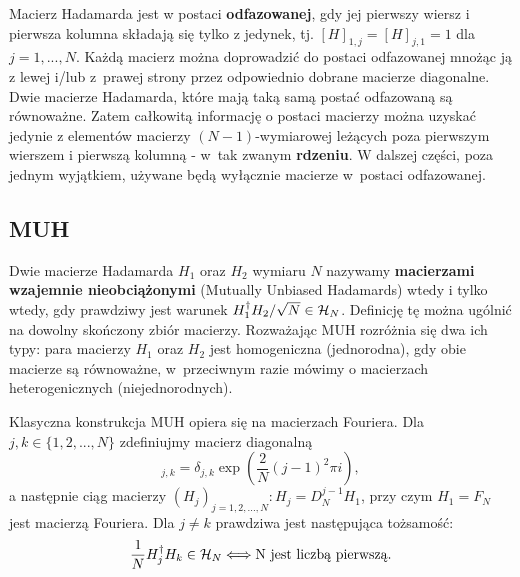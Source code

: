 \documentclass[a4paper,12pt,twoside]{article}
\newcommand{\HADAMARDS}[1]{{\cal H}_{#1}}
\begin{document}
Macierz Hadamarda jest w postaci \textbf{odfazowanej}, gdy jej pierwszy wiersz i pierwsza kolumna sk{\l}adaj\k{a} si\k{e} tylko z jedynek, tj. $[H]_{1,j} = [H]_{j,1} = 1$ dla $j = 1, ..., N$. Ka\.{z}d\k{a} macierz mo\.{z}na doprowadzi\'{c} do postaci odfazowanej mno\.{z}\k{a}c j\k{a} z lewej i/lub z~prawej strony przez odpowiednio dobrane macierze diagonalne. Dwie macierze Hadamarda, kt\'{o}re maj\k{a} tak\k{a} sam\k{a} posta\'{c} odfazowan\k{a} s\k{a} r\'{o}wnowa\.{z}ne. Zatem ca{\l}kowit\k{a} informacj\k{e} o postaci macierzy mo\.{z}na uzyska\'{c} jedynie z element\'{o}w ma\-cie\-rzy $(N-1)$-wymiarowej le\.{z}\k{a}cych poza pierwszym wierszem i pierwsz\k{a} kolumn\k{a} - w~tak zwanym \textbf{rdzeniu}. W dalszej cz\k{e}\'{s}ci, poza jednym wyj\k{a}tkiem, u\.{z}ywane b\k{e}d\k{a} wy{\l}\k{a}cznie macierze w~postaci odfazowanej.


\subsection*{MUH}

Dwie macierze Hadamarda $H_1$ oraz $H_2$ wymiaru $N$ nazywamy \textbf{macierzami wzajemnie nieobci\k{a}\.{z}onymi} (Mutually Unbiased Hadamards) wtedy i tylko wtedy, gdy prawdziwy jest warunek $H_1^\dagger H_2/\sqrt{N} \in \HADAMARDS{N}$. Definicj\k{e} t\k{e} mo\.{z}na ug\'{o}lni\'{c} na dowolny sko\'{n}czony zbi\'{o}r macierzy. Rozwa\.{z}aj\k{a}c MUH rozr\'{o}\.{z}nia si\k{e} dwa ich typy: para macierzy $H_1$ oraz $H_2$ jest homogeniczna (jednorodna), gdy obie macierze s\k{a} r\'{o}wnowa\.{z}ne, w~przeciwnym razie m\'{o}wimy o macierzach heterogenicznych (niejednorodnych).

Klasyczna konstrukcja MUH opiera si\k{e} na macierzach Fouriera. Dla $j,k\in\{1,2,...,N\}$ zdefiniujmy macierz diagonaln\k{a}
\begin{equation}
[D_N]_{j,k} = \delta_{j,k} \exp\left(\frac{2}{N}(j-1)^2\pi i \right),
\end{equation}
a nast\k{e}pnie ci\k{a}g macierzy $\left(H_j\right)_{j=1,2,...,N} : H_j = D_N^{j-1} H_1$, przy czym $H_1 = F_N$ jest macierz\k{a} Fouriera. Dla $j \neq k$ prawdziwa jest nast\k{e}puj\k{a}ca to\.{z}samo\'{s}\'{c}:
\begin{equation}
\frac{1}{N} H_j^{\dagger} H_k \in \HADAMARDS{N} \Longleftrightarrow \text{N jest liczb\k{a} pierwsz\k{a}.}
\end{equation}
\end{document}
